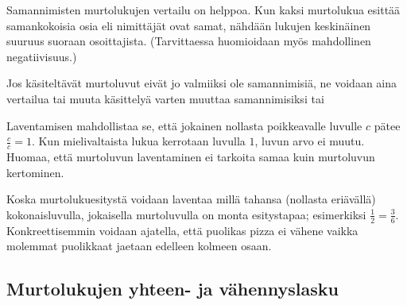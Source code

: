 Samannimisten murtolukujen vertailu on helppoa. Kun kaksi murtolukua esittää samankokoisia osia eli nimittäjät ovat samat, nähdään lukujen keskinäinen suuruus suoraan osoittajista. (Tarvittaessa huomioidaan myös mahdollinen negatiivisuus.)


Jos käsiteltävät murtoluvut eivät jo valmiiksi ole samannimisiä, ne voidaan aina vertailua tai muuta käsittelyä varten muuttaa samannimisiksi  tai  %


Laventamisen mahdollistaa se, että jokainen nollasta poikkeavalle luvulle $c$ pätee $\frac{c}{c}=1$. Kun mielivaltaista lukua kerrotaan luvulla $1$, luvun arvo ei muutu. Huomaa, että murtoluvun laventaminen ei tarkoita samaa kuin murtoluvun kertominen.

Koska murtolukuesitystä voidaan laventaa millä tahansa (nollasta eriävällä) kokonaisluvulla, jokaisella murtoluvulla on monta esitystapaa; esimerkiksi $\frac{1}{2}=\frac{3}{6}$. Konkreettisemmin voidaan ajatella, että puolikas pizza ei vähene vaikka molemmat puolikkaat jaetaan edelleen kolmeen osaan.



\subsection{Murtolukujen yhteen- ja vähennyslasku}

